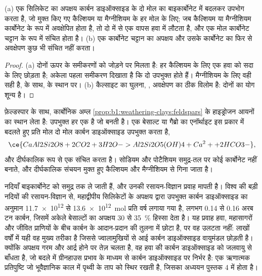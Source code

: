 \begin{proposition}\label{prop:b1:weathering-clays:co2}
(a) एक सिलिकेट का अपक्षय कार्बन डाइऑक्साइड के दो मोल का बाइकार्बोनेट में बदलकर उपभोग करता है, जो मुक्त किए गए कैल्शियम या मैग्नीशियम के हर मोल के लिए; जब कैल्शियम या मैग्नीशियम कार्बोनेट के रूप में अवक्षेपित होता है, तो दो में से एक वापस हवा में लौटता है, और एक मोल कार्बोनेट चट्टान के रूप में संचित होता है। (b) एक कार्बोनेट चट्टान का अपक्षय और उसके कार्बोनेट का फिर से अवक्षेपण कुछ भी संचित नहीं करता।
\end{proposition}

\begin{proof}
(a) दोनों ऊपर के समीकरणों को जोड़ने पर  मिलता है: हर कैल्शियम के लिए एक  हवा को सदा के लिए छोड़ता है; अकेला पहला समीकरण दिखाता है कि दो उपभुक्त होते हैं। मैग्नीशियम के लिए वही सही है,  के साथ,  के स्थान पर। (b) कैल्साइट का घुलना, , अवक्षेपण का ठीक विलोम है: दोनों का योग शून्य है।
\end{proof}

फ़ेल्डस्पार के साथ, कार्बोनिक अम्ल \cref{prop:b1:weathering-clays:feldspars} के हाइड्रोजन आयनों का स्थान लेता है: उपभुक्त हर  एक  है जो  बनती है। एक बेसाल्ट या गैब्रो का एनॉर्थाइट इस प्रकार  में बदलते हुए प्रति मोल दो मोल कार्बन डाइऑक्साइड उपभुक्त करता है,
\[
  \ce{CaAl2Si2O8 + 2 CO2 + 3 H2O -> Al2Si2O5(OH)4 + Ca^2+ + 2 HCO3-},
\]
और दीर्घकालिक रूप से एक संचित करता है। सोडियम और पोटैशियम समुद्र-तल पर कोई कार्बोनेट नहीं बनाते, और दीर्घकालिक संचयन मुक्त हुए कैल्शियम और मैग्नीशियम से गिना जाता है।

नदियाँ बाइकार्बोनेट को समुद्र तक ले जाती हैं, और उनकी रसायन-विज्ञान प्रवाह मापती है। विश्व की बड़ी नदियों की रसायन-विज्ञान से, महाद्वीपीय सिलिकेटों के अपक्षय द्वारा उपभुक्त कार्बन डाइऑक्साइड का अनुमान \num{11.7e12} से \qty{13.6e12}{mol} प्रति वर्ष लगाया गया है, लगभग 0.14 से 0.16 अरब टन कार्बन, जिसमें अकेले बेसाल्टों का अपक्षय 30 से \qty{35}{\percent} हिस्सा देता है। यह प्रवाह हवा, महासागरों और जीवित प्राणियों के बीच कार्बन के आदान-प्रदान की तुलना में छोटा है, पर वह उलटता नहीं: लाखों वर्षों में यही वह मुख्य तरीका है जिससे ज्वालामुखियों से आई कार्बन डाइऑक्साइड वायुमंडल छोड़ती है। क्योंकि अपक्षय गरम और आर्द्र होने पर तेज़ चलता है, वह हवा की कार्बन डाइऑक्साइड को जलवायु से बाँधता है, जो बदले में ग्रीनहाउस प्रभाव के माध्यम से कार्बन डाइऑक्साइड पर निर्भर है: एक ऋणात्मक प्रतिपुष्टि जो भूवैज्ञानिक काल में पृथ्वी के ताप को स्थिर रखती है, जिसका अध्ययन पुस्तक 4 में होता है।

